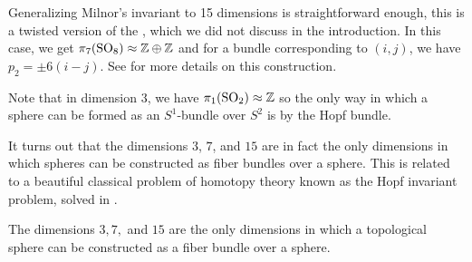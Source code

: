 Generalizing Milnor's invariant to 15 dimensions is straightforward enough, this is a twisted version of the , which we did not discuss in the introduction. In this case, we get $\pi_7(\mathrm{SO}_8)\approx \mathbb{Z}\oplus \mathbb{Z}$ and for a bundle corresponding to $(i,j)$, we have $p_2=\pm 6(i-j)$. See \cite{shimada1957differentiable} for more details on this construction. 

\begin{remark}
	Note that in dimension $3$, we have $\pi_1(\mathrm{SO}_2)\approx \mathbb{Z}$ so the only way in which a sphere can be formed as an $S^1$-bundle over $S^2$ is by the Hopf bundle.
\end{remark}

It turns out that the dimensions $3$, $7$, and $15$ are in fact the only dimensions in which spheres can be constructed as fiber bundles over a sphere. This is related to a beautiful classical problem of homotopy theory known as the Hopf invariant problem, solved in \cite{adams1960}.

\begin{theorem}\label{thm:hopf-homotopy-spheres}
	The dimensions $3, 7,$ and $15$ are the only dimensions in which a topological sphere can be constructed as a fiber bundle over a sphere.
\end{theorem}
